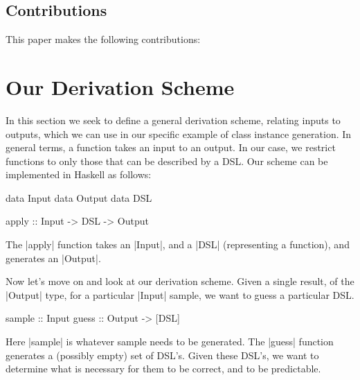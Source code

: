\documentclass[preprint]{sigplanconf}
\begin{document}
\subsection{Contributions}

This paper makes the following contributions:


\section{Our Derivation Scheme}

In this section we seek to define a general derivation scheme, relating inputs to outputs, which we can use in our specific example of class instance generation. In general terms, a function takes an input to an output. In our case, we restrict functions to only those that can be described by a DSL. Our scheme can be implemented in Haskell as follows:

\begin{code}
data Input
data Output
data DSL

apply :: Input -> DSL -> Output
\end{code}

The |apply| function takes an |Input|, and a |DSL| (representing a function), and generates an |Output|.

Now let's move on and look at our derivation scheme. Given a single result, of the |Output| type, for a particular |Input| sample, we want to guess a particular DSL.

\begin{code}
sample :: Input
guess :: Output -> [DSL]
\end{code}


Here |sample| is whatever sample needs to be generated. The |guess| function generates a (possibly empty) set of DSL's. Given these DSL's, we want to determine what is necessary for them to be correct, and to be predictable.
\end{document}
